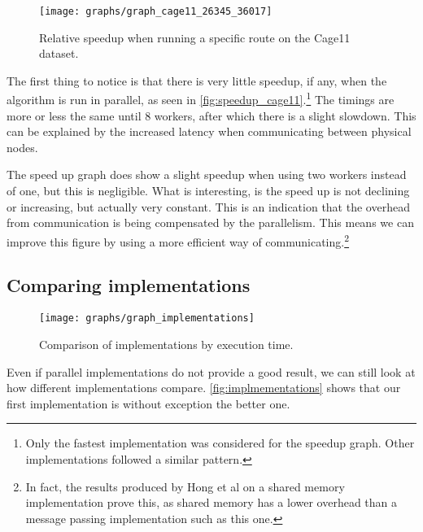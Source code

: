 \begin{figure}
  \texttt{[image: graphs/graph\_cage11\_26345\_36017]}
  \caption{Relative speedup when running a specific route on the Cage11 dataset.}
  \label{fig:speedup_cage11}
\end{figure}

The first thing to notice is that there is very little speedup, if any, when the algorithm is run in parallel, as seen in \autoref{fig:speedup_cage11}.\footnote{Only the fastest implementation was considered for the speedup graph. Other implementations followed a similar pattern.} The timings are more or less the same until 8 workers, after which there is a slight slowdown. This can be explained by the increased latency when communicating between physical nodes.

The speed up graph does show a slight speedup when using two workers instead of one, but this is negligible. What is interesting, is the speed up is not declining or increasing, but actually very constant. This is an indication that the overhead from communication is being compensated by the parallelism. This means we can improve this figure by using a more efficient way of communicating.\footnote{In fact, the results produced by Hong et al \cite{LockFreeMultithreadedMaxFlow} on a shared memory implementation prove this, as shared memory has a lower overhead than a message passing implementation such as this one.}

\subsection{Comparing implementations}

\begin{figure}
  \texttt{[image: graphs/graph\_implementations]}
  \caption{Comparison of implementations by execution time.}
  \label{fig:implmementations}
\end{figure}

Even if parallel implementations do not provide a good result, we can still look at how different implementations compare. \autoref{fig:implmementations} shows that our first implementation is without exception the better one.
